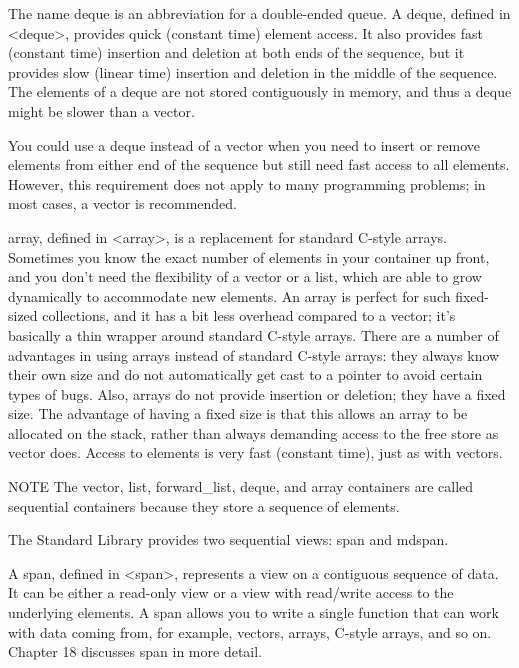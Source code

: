 
The name deque is an abbreviation for a double-ended queue. A deque, defined in <deque>, provides quick (constant time) element access. It also provides fast (constant time) insertion and deletion at both ends of the sequence, but it provides slow (linear time) insertion and deletion in the middle of the sequence. The elements of a deque are not stored contiguously in memory, and thus a deque might be slower than a vector.

You could use a deque instead of a vector when you need to insert or remove elements from either end of the sequence but still need fast access to all elements. However, this requirement does not apply to many programming problems; in most cases, a vector is recommended.


array, defined in <array>, is a replacement for standard C-style arrays. Sometimes you know the exact number of elements in your container up front, and you don’t need the flexibility of a vector or a list, which are able to grow dynamically to accommodate new elements. An array is perfect for such fixed-sized collections, and it has a bit less overhead compared to a vector; it’s basically a thin wrapper around standard C-style arrays. There are a number of advantages in using arrays instead of standard C-style arrays: they always know their own size and do not automatically get cast to a pointer to avoid certain types of bugs. Also, arrays do not provide insertion or deletion; they have a fixed size. The advantage of having a fixed size is that this allows an array to be allocated on the stack, rather than always demanding access to the free store as vector does. Access to elements is very fast (constant time), just as with vectors.

\begin{myNotic}{NOTE}
The vector, list, forward\_list, deque, and array containers are called sequential containers because they store a sequence of elements.
\end{myNotic}


The Standard Library provides two sequential views: span and mdspan.


A span, defined in <span>, represents a view on a contiguous sequence of data. It can be either a read-only view or a view with read/write access to the underlying elements. A span allows you to write a single function that can work with data coming from, for example, vectors, arrays, C-style arrays, and so on. Chapter 18 discusses span in more detail.

